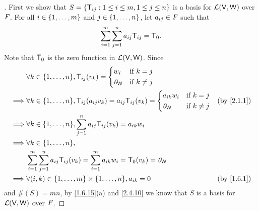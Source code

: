 \begin{proof}[]
  First we show that \(S = \left\lbrace\mathsf{T}_{i j} : 1 \leq i \leq m, 1 \leq j \leq n\right\rbrace\) is a basis for \(\mathcal{L}(\mathsf{V}, \mathsf{W})\) over \(\mathit{F}\).
  For all \(i \in \left\lbrace1, \dots, m\right\rbrace\) and \(j \in \left\lbrace1, \dots, n\right\rbrace\), let \(a_{i j} \in \mathit{F}\) such that
  \[
    \sum_{i = 1}^m \sum_{j = 1}^n a_{i j} \mathsf{T}_{i j} = \mathsf{T}_0.
  \]
  Note that \(\mathsf{T}_0\) is the zero function in \(\mathcal{L}(\mathsf{V}, \mathsf{W})\).
  Since
  \begin{align*}
             & \forall k \in \set{1, \dots, n}, \T_{i j}(v_k) = \begin{dcases}
                                                                  w_i      & \text{if } k = j    \\
                                                                  \zv_{\W} & \text{if } k \neq j
                                                                \end{dcases}                                        \\
    \implies & \forall k \in \set{1, \dots, n}, \T_{i j}(a_{i j} v_k) = a_{i j} \T_{i j}(v_k) = \begin{dcases}
                                                                                                  a_{i k} w_i & \text{if } k = j    \\
                                                                                                  \zv_{\W}    & \text{if } k \neq j
                                                                                                \end{dcases}        &  & \by{2.1.1}   \\
    \implies & \forall k \in \set{1, \dots, n}, \sum_{j = 1}^n a_{i j} \T_{i j}(v_k) = a_{i k} w_i                                    \\
    \implies & \forall k \in \set{1, \dots, n},                                                                                       \\
             & \sum_{i = 1}^m \sum_{j = 1}^n a_{i j} \T_{i j}(v_k) = \sum_{i = 1}^m a_{i k} w_i = \zT(v_k) = \zv_{\W}                 \\
    \implies & \forall (i, k) \in \set{1, \dots, m} \times \set{1, \dots, n}, a_{i k} = 0                             &  & \by{1.6.1}
  \end{align*}
  and \(\#(S) = mn\), by \cref{1.6.15}(a) and \cref{2.4.10} we know that \(S\) is a basis for \(\mathcal{L}(\mathsf{V}, \mathsf{W})\) over \(\mathit{F}\).


\end{proof}
